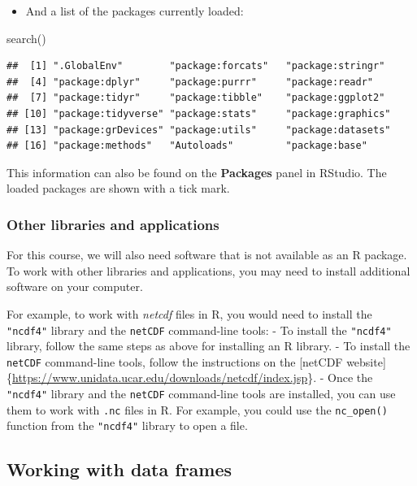 \documentclass[
]{book}
\newenvironment{Shaded}{\begin{snugshade}}{\end{snugshade}}
\newcommand{\FunctionTok}[1]{\textcolor[rgb]{0.00,0.00,0.00}{#1}}
\newcommand{\NormalTok}[1]{#1}
\providecommand{\tightlist}{%
  \setlength{\itemsep}{0pt}\setlength{\parskip}{0pt}}
\begin{document}
\begin{itemize}
\tightlist
\item
  And a list of the packages currently loaded:
\end{itemize}

\begin{Shaded}
\begin{Highlighting}[]
\FunctionTok{search}\NormalTok{()}
\end{Highlighting}
\end{Shaded}

\begin{verbatim}
##  [1] ".GlobalEnv"        "package:forcats"   "package:stringr"  
##  [4] "package:dplyr"     "package:purrr"     "package:readr"    
##  [7] "package:tidyr"     "package:tibble"    "package:ggplot2"  
## [10] "package:tidyverse" "package:stats"     "package:graphics" 
## [13] "package:grDevices" "package:utils"     "package:datasets" 
## [16] "package:methods"   "Autoloads"         "package:base"
\end{verbatim}

This information can also be found on the \textbf{Packages} panel in RStudio. The loaded packages are shown with a tick mark.

\hypertarget{other-libraries-and-applications}{%
\subsubsection{Other libraries and applications}\label{other-libraries-and-applications}}

For this course, we will also need software that is not available as an R package. To work with other libraries and applications, you may need to install additional software on your computer.

For example, to work with \emph{netcdf} files in R, you would need to install the \texttt{"ncdf4"} library and the \texttt{netCDF} command-line tools:
- To install the \texttt{"ncdf4"} library, follow the same steps as above for installing an R library.
- To install the \texttt{netCDF} command-line tools, follow the instructions on the {[}netCDF website{]}\{\url{https://www.unidata.ucar.edu/downloads/netcdf/index.jsp}\}.
- Once the \texttt{"ncdf4"} library and the \texttt{netCDF} command-line tools are installed, you can use them to work with \texttt{.nc} files in R. For example, you could use the \texttt{nc\_open()} function from the \texttt{"ncdf4"} library to open a file.

\hypertarget{working-with-data-frames}{%
\subsection{Working with data frames}\label{working-with-data-frames}}
\end{document}
